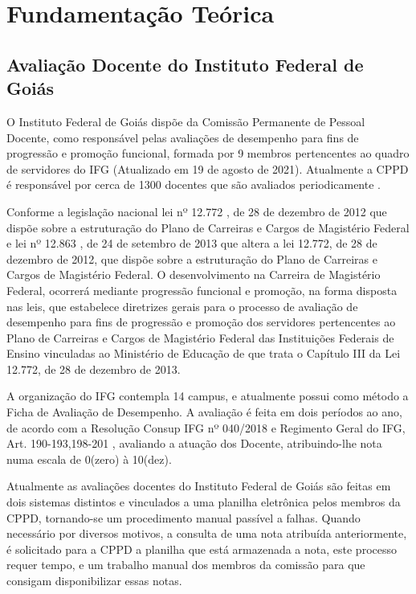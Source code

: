 \chapter{Fundamentação Teórica}

  
\section{Avaliação Docente do Instituto Federal de Goiás}
    O Instituto Federal de Goiás dispõe da Comissão Permanente de Pessoal Docente, como responsável pelas avaliações de desempenho para fins de progressão e promoção funcional, formada por 9 membros pertencentes ao quadro de servidores do IFG (Atualizado em 19 de agosto de 2021). Atualmente a CPPD é responsável por cerca de 1300 docentes que são avaliados periodicamente \cite{cppd}.
    
    Conforme a legislação nacional lei nº 12.772 , de 28 de dezembro de 2012 que dispõe sobre a estruturação do Plano de Carreiras e Cargos de Magistério Federal e lei nº 12.863 , de 24 de setembro de 2013 que altera a lei 12.772, de 28 de dezembro de 2012, que dispõe sobre a estruturação do Plano de Carreiras e Cargos de Magistério Federal. O desenvolvimento na Carreira de Magistério Federal, ocorrerá mediante progressão funcional e promoção, na forma disposta nas leis, que estabelece diretrizes gerais para o processo de avaliação de desempenho para fins de progressão e promoção dos servidores pertencentes ao Plano de Carreiras e Cargos de Magistério Federal das Instituições Federais de Ensino vinculadas ao Ministério de Educação de que trata o Capítulo III da Lei 12.772, de 28 de dezembro de 2013.
    
    A organização do IFG contempla 14 campus, e atualmente possui como método a Ficha de Avaliação de Desempenho. A avaliação é feita em dois períodos ao ano, de acordo com a Resolução Consup IFG nº 040/2018  e Regimento Geral do IFG, Art. 190-193,198-201 , avaliando a atuação dos Docente, atribuindo-lhe nota numa escala de 0(zero) à 10(dez). 
    
    Atualmente as avaliações docentes do Instituto Federal de Goiás são feitas em dois sistemas distintos e vinculados a uma planilha eletrônica pelos membros da CPPD, tornando-se um procedimento manual passível a falhas. Quando necessário por diversos motivos, a consulta de uma nota atribuída anteriormente, é solicitado para a CPPD a planilha que está armazenada a nota, este processo requer tempo, e um trabalho manual dos membros da comissão para que consigam disponibilizar essas notas. 
    

